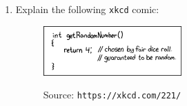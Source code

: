 \begin{enumerate}[label={1.\arabic*},leftmargin=1cm]
	\item Explain the following \texttt{xkcd} comic:
		\begin{figure}[htbp]
			\centering
			\includegraphics[width=0.5\textwidth]{fig/1_xkcd_random_number.png}
			\captionsetup{labelformat=empty}
			\label{fig:xkcd_random}
			\caption{Source: \texttt{https://xkcd.com/221/}}
		\end{figure}
\end{enumerate}


